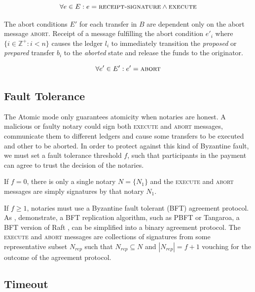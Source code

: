 \documentclass[letterpaper,twocolumn,10pt]{article}
\begin{document}

\begin{equation}
\forall e \in E : e = \textsc{receipt-signature} \land \textsc{execute}
\end{equation}

The abort conditions $E'$ for each transfer in $B$ are dependent only on the abort message \textsc{abort}. Receipt of a message fulfilling the abort condition $e'_i$ where $\{ i \in \mathbb{Z}^+ : i < n \}$ causes the ledger $l_i$ to immediately transition the \textit{proposed} or \textit{prepared} transfer $b_i$ to the \textit{aborted} state and release the funds to the originator.

\begin{equation}
\forall e' \in E' : e' = \textsc{abort}
\end{equation}

\subsection{Fault Tolerance}
\label{subsec:fault-tolerance}

The Atomic mode only guarantees atomicity when notaries are honest. A malicious or faulty notary could sign both \textsc{execute} and \textsc{abort} messages, communicate them to different ledgers and cause some transfers to be executed and other to be aborted. In order to protect against this kind of Byzantine fault, we must set a fault tolerance threshold $f$, such that participants in the payment can agree to trust the decision of the notaries.

If $f = 0$, there is only a single notary $N = \{ N_1 \}$ and the \textsc{execute} and \textsc{abort} messages are simply signatures by that notary $N_1$.

If $f \geq 1$, notaries must use a Byzantine fault tolerant (BFT) agreement protocol. As \cite{gray2006consensus}, \cite{mohan1983method} demonstrate, a BFT replication algorithm, such as PBFT \cite{castro1999practical} or Tangaroa, a BFT version of Raft \cite{copelandtangaroa}, can be simplified into a binary agreement protocol. The \textsc{execute} and \textsc{abort} messages are collections of signatures from some representative subset $N_{rep}$ such that $N_{rep} \subseteq N$ and $|N_{rep}| = f+1$ vouching for the outcome of the agreement protocol.

\subsection{Timeout}
\label{subsec:timeout}
\end{document}
